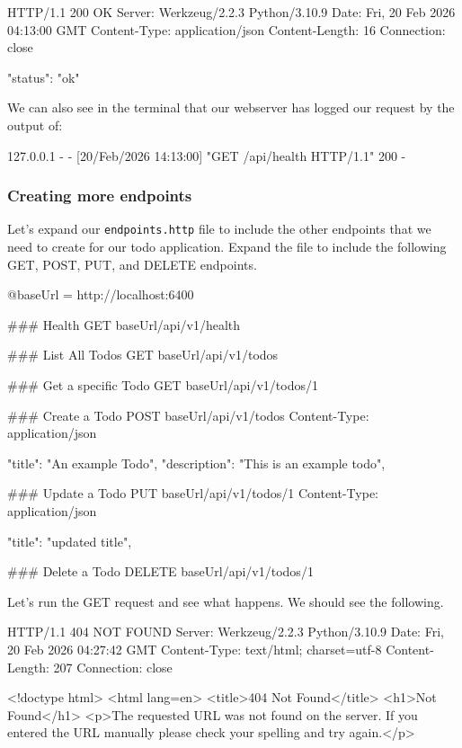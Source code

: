 \documentclass{csse4400}
\begin{document}
\begin{code}[language=json,numbers=none]{}
  HTTP/1.1 200 OK
  Server: Werkzeug/2.2.3 Python/3.10.9
  Date: Fri, 20 Feb 2026 04:13:00 GMT
  Content-Type: application/json
  Content-Length: 16
  Connection: close
    
  {
    "status": "ok"
  }
\end{code}

We can also see in the terminal that our webserver has logged our request by the output of:

\begin{code}[language=bash,numbers=none]{}
  127.0.0.1 - - [20/Feb/2026 14:13:00] "GET /api/health HTTP/1.1" 200 -
\end{code}

\subsubsection{Creating more endpoints}

Let's expand our \texttt{endpoints.http} file to include the other endpoints that we need to create for our todo application.
Expand the file to include the following GET, POST, PUT, and DELETE endpoints.

\begin{code}[numbers=none]{}
  @baseUrl = http://localhost:6400

  ### Health
  GET {{baseUrl}}/api/v1/health
  
  ### List All Todos
  GET {{baseUrl}}/api/v1/todos
  
  ### Get a specific Todo
  GET {{baseUrl}}/api/v1/todos/1
  
  ### Create a Todo
  POST {{baseUrl}}/api/v1/todos
  Content-Type: application/json
  
  {
      "title": "An example Todo",
      "description": "This is an example todo",
  }
  
  ### Update a Todo
  PUT {{baseUrl}}/api/v1/todos/1
  Content-Type: application/json
  
  {
      "title": "updated title",
  }
  
  ### Delete a Todo
  DELETE {{baseUrl}}/api/v1/todos/1
  
\end{code}

Let's run the GET request and see what happens. We should see the following.

\begin{code}[language=html,numbers=none]{}
  HTTP/1.1 404 NOT FOUND
  Server: Werkzeug/2.2.3 Python/3.10.9
  Date: Fri, 20 Feb 2026 04:27:42 GMT
  Content-Type: text/html; charset=utf-8
  Content-Length: 207
  Connection: close
  
  <!doctype html>
  <html lang=en>
  <title>404 Not Found</title>
  <h1>Not Found</h1>
  <p>The requested URL was not found on the server. If you entered the URL manually please check your spelling and try again.</p>  
\end{code}
\end{document}
